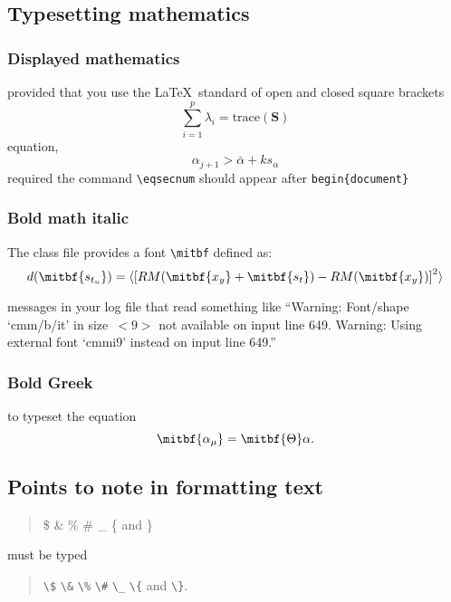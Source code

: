 \subsection{Typesetting mathematics}

\subsubsection{Displayed mathematics}

provided that you use the \LaTeX\ standard of open and closed square brackets
\[
 \sum_{i=1}^p \lambda_i =
{\mathrm{trace}}(\mathbf{S})
\]
equation, \[ \alpha_{j+1} > \bar{\alpha}+ks_{\alpha} \]
required the command \verb"\eqsecnum" should appear after \verb"begin{document}"

\subsubsection{Bold math italic}\label{boldmathitalic}

The class file provides a font \verb"\mitbf" defined as:
\begin{equation}
  d(\mitbf{s_{t_u}}) = \langle {[RM(\mitbf{x_y} + \mitbf{s_t}) - RM(\mitbf{x_y})]}^2 \rangle
\end{equation}

messages in your log file that read something like ``Warning: Font/shape
`cmm/b/it' in size~\hbox{$< \!\! 9 \!\! >$} not available on input line 649.
Warning: Using external font `cmmi9' instead on input line 649.''


\subsubsection{Bold Greek}\label{boldgreek}

to typeset the equation \[ \mitbf{{\alpha_{\mu}}} = \mitbf{\Theta} \alpha. \]

\subsection{Points to note in formatting text}\label{formtext}

\begin{quote}
\$ \& \% \# \_ \{ and \}
\end{quote}
must be typed
\begin{center}
\begin{quote}
\verb"\$" \verb"\&" \verb"\%" \verb"\#" \verb"\_" \verb"\{" and \verb"\}".
\end{quote}
\end{center}


